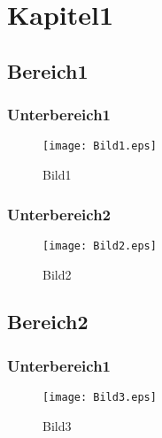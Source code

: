 \documentclass[a4paper,11pt]{scrreprt}
\begin{document}
\tableofcontents
\listoffigures

\chapter{Kapitel1}


\section{Bereich1}

\subsection{Unterbereich1}
\begin{figure}
\texttt{[image: Bild1.eps]}
\caption{Bild1}
\end{figure}
\subsection{Unterbereich2}
\begin{figure}
\texttt{[image: Bild2.eps]}
\caption{Bild2}
\end{figure}

\section{Bereich2}

\subsection{Unterbereich1}
\begin{figure}
\texttt{[image: Bild3.eps]}
\caption{Bild3}
\end{figure}
\end{document}
